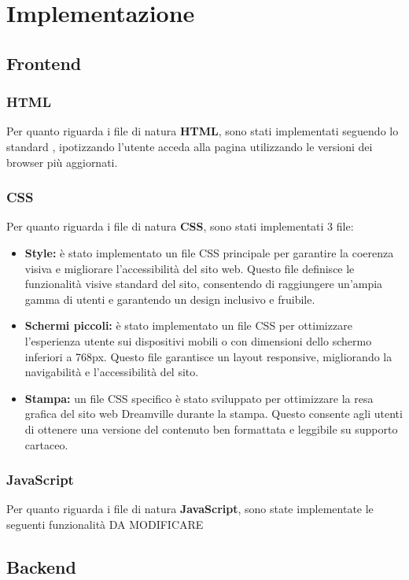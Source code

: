 \section{Implementazione}
\subsection{Frontend}
\subsubsection{HTML}
Per quanto riguarda i file di natura \textbf{HTML}, sono stati implementati seguendo lo standard , ipotizzando l'utente acceda alla pagina utilizzando le versioni dei browser più aggiornati.

\subsubsection{CSS}
Per quanto riguarda i file di natura \textbf{CSS}, sono stati implementati 3 file:
\begin{itemize}
    \item \textbf{Style:} è stato implementato un file CSS principale per garantire la coerenza visiva e migliorare l'accessibilità del sito web. Questo file definisce le funzionalità visive standard del sito, consentendo di raggiungere un'ampia gamma di utenti e garantendo un design inclusivo e fruibile.
    \item \textbf{Schermi piccoli:} è stato implementato un file CSS per ottimizzare l'esperienza utente sui dispositivi mobili o con dimensioni dello schermo inferiori a 768px. Questo file garantisce un layout responsive, migliorando la navigabilità e l'accessibilità del sito.
    \item \textbf{Stampa:} un file CSS specifico è stato sviluppato per ottimizzare la resa grafica del sito web Dreamville durante la stampa. Questo consente agli utenti di ottenere una versione del contenuto ben formattata e leggibile su supporto cartaceo.
\end{itemize}


\subsubsection{JavaScript}
Per quanto riguarda i file di natura \textbf{JavaScript}, sono state implementate le seguenti funzionalità 
DA MODIFICARE

\subsection{Backend}
